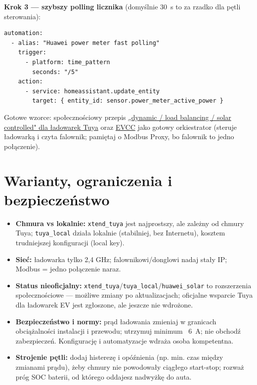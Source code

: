\documentclass[11pt]{article}
\newcommand{\key}[1]{\textbf{\color{navy}#1}}
\begin{document}
\key{Krok 3 — szybszy polling licznika} (domyślnie 30~s to za rzadko dla pętli sterowania):
\begin{lstlisting}
automation:
  - alias: "Huawei power meter fast polling"
    trigger:
      - platform: time_pattern
        seconds: "/5"
    action:
      - service: homeassistant.update_entity
        target: { entity_id: sensor.power_meter_active_power }
\end{lstlisting}

Gotowe wzorce: społecznościowy przepis \href{https://community.home-assistant.io/t/turn-your-tuya-ev-charger-dynamic-load-balancing-or-solar-controlled/854072}{„dynamic / load balancing / solar controlled" dla ładowarek Tuya} oraz \href{https://evcc.io/}{EVCC} jako gotowy orkiestrator (steruje ładowarką i czyta falownik; pamiętaj o Modbus Proxy, bo falownik to jedno połączenie).

\section{Warianty, ograniczenia i bezpieczeństwo}
\begin{itemize}
\item \key{Chmura vs lokalnie:} \texttt{xtend\_tuya} jest najprostszy, ale zależny od chmury Tuya; \texttt{tuya\_local} działa lokalnie (stabilniej, bez Internetu), kosztem trudniejszej konfiguracji (local key).
\item \key{Sieć:} ładowarka tylko 2,4 GHz; falownikowi/donglowi nadaj stały IP; Modbus = jedno połączenie naraz.
\item \key{Status nieoficjalny:} \texttt{xtend\_tuya}/\texttt{tuya\_local}/\texttt{huawei\_solar} to rozszerzenia społecznościowe — możliwe zmiany po aktualizacjach; oficjalne wsparcie Tuya dla ładowarek EV jest zgłoszone, ale jeszcze nie wdrożone.
\item \key{Bezpieczeństwo i normy:} prąd ładowania zmieniaj w granicach obciążalności instalacji i przewodu; utrzymuj minimum ~6~A; nie obchodź zabezpieczeń. Konfigurację i automatyzacje wdraża osoba kompetentna.
\item \key{Strojenie pętli:} dodaj histerezę i opóźnienia (np. min. czas między zmianami prądu), żeby chmury nie powodowały ciągłego start-stop; rozważ próg SOC baterii, od którego oddajesz nadwyżkę do auta.
\end{itemize}
\end{document}
